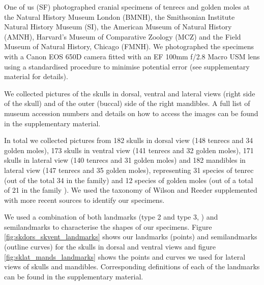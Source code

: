 \documentclass[12pt,a4paper]{article}
\begin{document}
	
	One of us (SF) photographed cranial specimens of tenrecs and golden moles at the Natural History Museum London (BMNH), the Smithsonian Institute Natural History Museum (SI), the American Museum of Natural History (AMNH), Harvard's Museum of Comparative Zoology (MCZ) and the Field Museum of Natural History, Chicago (FMNH). We photographed the specimens with a Canon EOS 650D camera fitted with an EF 100mm f/2.8 Macro USM lens using a standardised procedure to minimise potential error (see supplementary material for details). 

	We collected pictures of the skulls in dorsal, ventral and lateral views (right side of the skull) and of the outer (buccal) side of the right mandibles. A full list of museum accession numbers and details on how to access the images can be found in the supplementary material.
	

	In total we collected pictures from 182 skulls in dorsal view (148 tenrecs and 34 golden moles), 173 skulls in ventral view (141 tenrecs and 32 golden moles), 171 skulls in lateral view (140 tenrecs and 31 golden moles) and 182 mandibles in lateral view (147 tenrecs and 35 golden moles), representing 31 species of tenrec (out of the total 34 in the family) and 12 species of golden moles (out of a total of 21 in the family \citep{Asher2010}). We used the taxonomy of Wilson and Reeder \citeyearpar{Wilson2005} supplemented with more recent sources \citep{IUCN2012, Olson2013} to identify our specimens. 
	

	We used a combination of both landmarks (type 2 and type 3, \citep{Zelditch2012}) and semilandmarks to characterise the shapes of our specimens. Figure \ref{fig:skdors_skvent_landmarks} shows our landmarks (points) and semilandmarks (outline curves) for the skulls in dorsal and ventral views and figure \ref{fig:sklat_mands_landmarks} shows the points and curves we used for lateral views of skulls and mandibles. Corresponding definitions of each of the landmarks can be found in the supplementary material.
	
\end{document}
